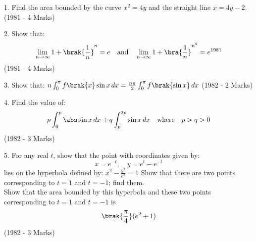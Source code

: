 \iffalse
  \title{Assignment}
  \author{AI2BTECH11008 - G.Sarvajith}
  \section{subjective}
\fi
\item 1. Find the area bounded by the curve $ x^2 = 4y $ and the straight line $ x = 4y - 2 $. \hfill (1981 - 4 Marks) \\
\item 2. Show that:
\begin{align*}
\lim_{n \to \infty} 1 +\brak{\frac{1}{n}}^n = e \quad \text{and} \quad \lim_{n \to \infty} 1 + \bra{\frac{1}{n}}^{n^2} = e^{1981}
\end{align*}
\hfill (1981 - 4 Marks) \\
\item 3. Show that:
$n \int_0^\pi f\brak{x} \sin x \, dx = \frac{n\pi}{2} \int_0^\pi f\brak{\sin x} \, dx$
\hfill (1982 - 2 Marks) \\
\item 4. Find the value of:
\begin{align*}
    p \int_0^p \abs \sin x \, dx + q \int_p^{2p} \sin x \, dx \quad \text{where} \quad p > q > 0
\end{align*}
\hfill (1982 - 3 Marks) \\
\item 5. For any real $ t $, show that the point with coordinates given by:
$$x = e^{-t}, \quad y = e^{t} - e^{-t}$$
lies on the hyperbola defined by:
$x^2 - \frac{y^2}{e^2} = 1$
Show that there are two points corresponding to  $t=1 $ and $ t=-1 $; find them.\\
Show that the area bounded by this hyperbola and these two points corresponding to $ t=1$ and $ t=-1 $ is \\
$$\brak{\frac{\pi}{4}}(e^2 + 1)$$
\hfill  (1982 - 3 Marks)
